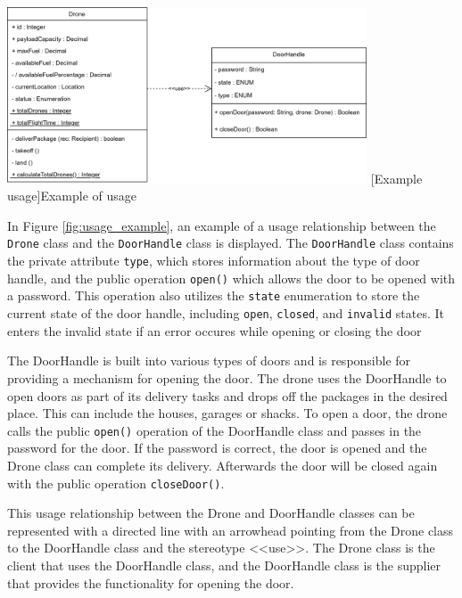 \documentclass[
	12pt,
    a4paper,
    egregdoesnotlikesansseriftitles, %
    toc=chapterentrywithdots,
    oneside, openany,
    titlepage,
    parskip=half,
    headings=normal,  %
    listof=totoc,
    bibliography=totoc,
    index=totoc,
    captions=tableheading,  %
    listof=flat,
    numbers=noenddot, %
    final]
    {scrbook}
\begin{document}

\vspace{1em}
\begin{minipage}{\linewidth}
	\centering
	\includegraphics[width=0.8\textwidth]{figures/dependencies/usage.jpg}
	[Example usage]{Example of usage}
	\label{fig:usage_example}
\end{minipage}
\vspace{1em}


In Figure \ref{fig:usage_example}, an example of a usage relationship between the \texttt{Drone} class and the \texttt{DoorHandle} class is displayed. The \texttt{DoorHandle} class contains the private attribute \texttt{type}, which stores information about the type of door handle, and the public operation \texttt{open()} which allows the door to be opened with a password.
This operation also utilizes the \texttt{state} enumeration to store the current state of the door handle, including \texttt{open}, \texttt{closed}, and \texttt{invalid} states.
It enters the invalid state if an error occures while opening or closing the door

The DoorHandle is built into various types of doors and is responsible for providing a mechanism for opening the door. 
The drone uses the DoorHandle to open doors as part of its delivery tasks and drops off the packages in the desired place. 
This can include the houses, garages or shacks. 
To open a door, the drone calls the public \texttt{open()} operation of the DoorHandle class and passes in the password for the door. 
If the password is correct, the door is opened and the Drone class can complete its delivery. 
Afterwards the door will be closed again with the public operation \texttt{closeDoor()}.

This usage relationship between the Drone and DoorHandle classes can be represented with a directed line with an arrowhead pointing from the Drone class to the DoorHandle class and the stereotype <<use>>. The Drone class is the client that uses the DoorHandle class, and the DoorHandle class is the supplier that provides the functionality for opening the door.
\end{document}

